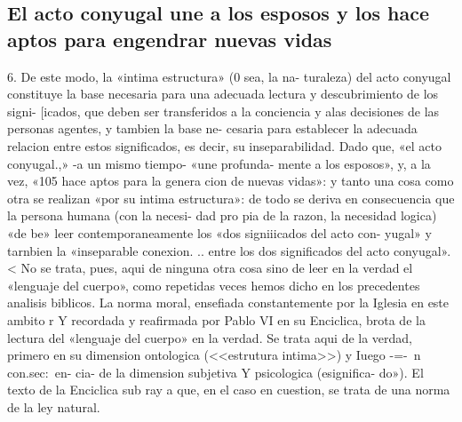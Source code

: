 \documentclass[letterpaper]{report}
\begin{document}
		\subsection{El acto conyugal une a los esposos y los hace aptos 
		 para engendrar nuevas vidas}
			6. De este modo, la «intima estructura» (0 sea, la na- 
			turaleza) del acto conyugal constituye la base necesaria 
			para una adecuada lectura y descubrimiento de los signi- 
			[icados, que deben ser transferidos a la conciencia y alas 
			decisiones de las personas agentes, y tambien la base ne- 
			cesaria para establecer la adecuada relacion entre estos 
			significados, es decir, su inseparabilidad. Dado que, «el 
			acto conyugal.,» -a un mismo tiempo- «une profunda- 
			mente a los esposos», y, a la vez, «105 hace aptos para la 
			genera cion de nuevas vidas»: y tanto una cosa como otra 
			se realizan «por su intima estructura»: de todo se deriva 
			en consecuencia que la persona humana (con la necesi- 
			dad pro pia de la razon, la necesidad logica) «de be» leer 
			contemporaneamente los «dos signiiicados del acto con- 
			yugal» y tarnbien la «inseparable conexion. .. entre los dos 
			significados del acto conyugal». 	< 
			No se trata, pues, aqui de ninguna otra cosa sino de 
			leer en la verdad el «lenguaje del cuerpo», como repetidas 
			veces hemos dicho en los precedentes analisis biblicos. La 
			norma moral, ensefiada constantemente por la Iglesia en 
			este ambito r Y recordada y reafirmada por Pablo VI en 
			su Enciclica, brota de la lectura del «lenguaje del cuerpo» 
			en la verdad. 
			Se trata aqui de la verdad, primero en su dimension 
			ontologica (<<estrutura intima>>) y Iuego -=-~n con.sec:~en- 
			cia- de la dimension subjetiva Y psicologica (esignifica- 
			do»). El texto de la Enciclica sub ray a que, en el caso en 
			cuestion, se trata de una norma de la ley natural.
	
\end{document}
